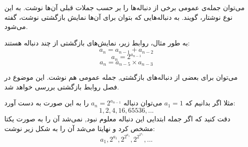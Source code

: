 
\begin{DEFINITION}
    \p
    می‌توان جمله‌ی عمومی برخی از دنباله‌ها را بر حسب جملات قبلی آن‌ها نوشت.
    به این نوع نوشتار،
    گویند.
    به دنباله‌هایی که بتوان برای آن‌ها نمایش بازگشتی نوشت،
    گفته می‌شود.
\end{DEFINITION}

\p
به طور مثال، روابط زیر، نمایش‌های بازگشتی از چند دنباله هستند:
$$a_n=a_{n-1}+a_{n-2}$$
$$a_n=2^{a_{n-1}}$$
$$a_n=a_{n-5}\times a_{n-3}$$

\p
می‌توان برای بعضی از دنباله‌های بازگشتی, جمله عمومی هم نوشت. این موضوع در فصل روابط بازگشتی بررسی خواهد شد.

\p
مثلا اگر بدانیم که 
$a_1=1$
می‌توان دنباله
$a_n=2^{a_{n-1}}$
را به این صورت به دست آورد:
\[1,2,4,16,65536,...\]
دقت کنید که اگر جمله ابتدایی این دنباله معلوم نبود, نمی‌شد آن را به صورت یکتا مشخص کرد و نهایتا می‌شد آن را به شکل زیر نوشت:
\[a_1,2^{a_1},2^{2^{a_1}},2^{2^{2^{a_1}}},...\]









